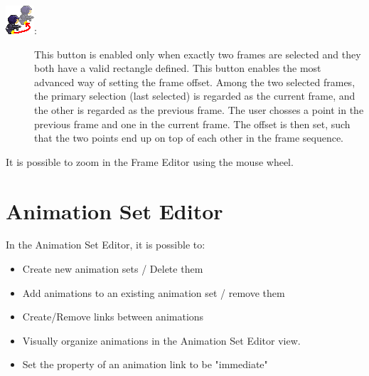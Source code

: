 \documentclass{article}
\begin{document}
\begin{description}
\item[\includegraphics{icons/TemporaryPivotOffset}:] This button is enabled only when exactly two frames are selected and they both have a valid rectangle defined. This button enables the most advanced way of setting the frame offset. Among the two selected frames, the primary selection (last selected) is regarded as the current frame, and the other is regarded as the previous frame. The user chosses a point in the previous frame and one in the current frame. The offset is then set, such that the two
points end up on top of each other in the frame sequence.

\end{description}

It is possible to zoom in the Frame Editor using the mouse wheel.

\section{Animation Set Editor}

In the Animation Set Editor, it is possible to:
\begin{itemize}
\item Create new animation sets / Delete them
\item Add animations to an existing animation set / remove them
\item Create/Remove links between animations
\item Visually organize animations in the Animation Set Editor view.
\item Set the property of an animation link to be "immediate"
\end{itemize}
\end{document}
